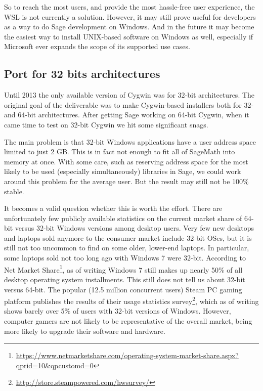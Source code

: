 So to reach the most users, and provide the most hassle-free user experience,
the WSL is not currently a solution.  However, it may still prove useful for
developers as a way to do Sage development on Windows. And in the future it may
become the easiest way to install UNIX-based software on Windows as well,
especially if Microsoft ever expands the scope of its supported use cases.

\hypertarget{port-for-32-bits-architectures}{%
\subsection{Port for 32 bits
architectures}\label{port-for-32-bits-architectures}}

Until 2013 the only available version of Cygwin was for 32-bit
architectures. The original goal of the deliverable was to make
Cygwin-based installers both for 32- and 64-bit architectures. After
getting Sage working on 64-bit Cygwin, when it came time to test on
32-bit Cygwin we hit some significant snags.

The main problem is that 32-bit Windows applications have a user address
space limited to just 2 GB. This is in fact not enough to fit all of
SageMath into memory at once. With some care, such as reserving address
space for the most likely to be used (especially simultaneously)
libraries in Sage, we could work around this problem for the average user.
But the result may still not be 100\% stable.

It becomes a valid question whether this is worth the effort. There are
unfortunately few publicly available statistics on the current market
share of 64-bit versus 32-bit Windows versions among desktop users. Very
few new desktops and laptops sold anymore to the consumer market include
32-bit OSes, but it is still not too uncommon to find on some older,
lower-end laptops. In particular, some laptops sold not too long ago
with Windows 7 were 32-bit. According to Net Market Share\footnote{\url{https://www.netmarketshare.com/operating-system-market-share.aspx?qprid=10\&qpcustomd=0}},
as of writing Windows 7 still makes up nearly 50\% of all desktop
operating system installments. This still does not tell us about 32-bit
versus 64-bit. The popular (12.5 million concurrent users) Steam PC
gaming platform publishes the results of their usage statistics
survey\footnote{\url{http://store.steampowered.com/hwsurvey/}}, which as
of writing shows barely over 5\% of users with 32-bit versions of
Windows. However, computer gamers are not likely to be representative of
the overall market, being more likely to upgrade their software and
hardware.

